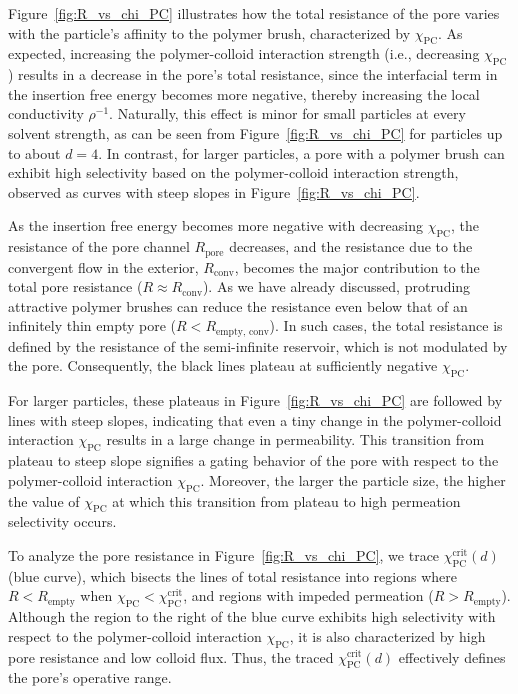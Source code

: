 \documentclass[12pt, a4paper]{article}
\begin{document}
Figure~\ref{fig:R_vs_chi_PC} illustrates how the total resistance of the pore varies with the particle's affinity to the polymer brush, characterized by $\chi_{\textrm{PC}}$.
As expected, increasing the polymer-colloid interaction strength (i.e., decreasing $\chi_{\textrm{PC}}$) results in a decrease in the pore's total resistance, since the interfacial term in the insertion free energy becomes more negative, thereby increasing the local conductivity $\rho^{-1}$.
Naturally, this effect is minor for small particles at every solvent strength, as can be seen from Figure~\ref{fig:R_vs_chi_PC} for particles up to about $d = 4$.
In contrast, for larger particles, a pore with a polymer brush can exhibit high selectivity based on the polymer-colloid interaction strength, observed as curves with steep slopes in Figure~\ref{fig:R_vs_chi_PC}.

As the insertion free energy becomes more negative with decreasing $\chi_{\textrm{PC}}$, the resistance of the pore channel $R_{\textrm{pore}}$ decreases, and the resistance due to the convergent flow in the exterior, $R_{\textrm{conv}}$, becomes the major contribution to the total pore resistance ($R \approx R_{\textrm{conv}}$).
As we have already discussed, protruding attractive polymer brushes can reduce the resistance even below that of an infinitely thin empty pore ($R < R_{\textrm{empty, conv}}$).
In such cases, the total resistance is defined by the resistance of the semi-infinite reservoir, which is not modulated by the pore.
Consequently, the black lines plateau at sufficiently negative $\chi_{\textrm{PC}}$.

For larger particles, these plateaus in Figure~\ref{fig:R_vs_chi_PC} are followed by lines with steep slopes, indicating that even a tiny change in the polymer-colloid interaction $\chi_{\textrm{PC}}$ results in a large change in permeability.
This transition from plateau to steep slope signifies a gating behavior of the pore with respect to the polymer-colloid interaction $\chi_{\textrm{PC}}$.
Moreover, the larger the particle size, the higher the value of $\chi_{\textrm{PC}}$ at which this transition from plateau to high permeation selectivity occurs.

To analyze the pore resistance in Figure~\ref{fig:R_vs_chi_PC}, we trace $\chi_{\textrm{PC}}^{\textrm{crit}}(d)$ (blue curve), which bisects the lines of total resistance into regions where $R < R_{\textrm{empty}}$ when $\chi_{\textrm{PC}} < \chi_{\textrm{PC}}^{\textrm{crit}}$, and regions with impeded permeation ($R > R_{\textrm{empty}}$).
Although the region to the right of the blue curve exhibits high selectivity with respect to the polymer-colloid interaction $\chi_{\textrm{PC}}$, it is also characterized by high pore resistance and low colloid flux.
Thus, the traced $\chi_{\textrm{PC}}^{\textrm{crit}}(d)$ effectively defines the pore's operative range.
\end{document}

